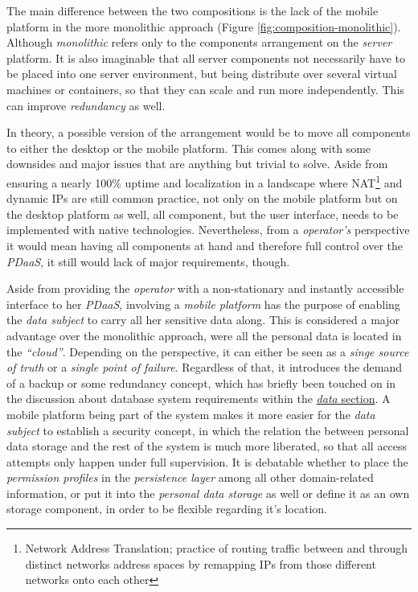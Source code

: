 \documentclass[12pt,english,a4paper,titlepage,cleardoublepage=empty,dottedtoc]{report}
\begin{document}
The main difference between the two compositions is the lack of the
mobile platform in the more monolithic approach (Figure
\ref{fig:composition-monolithic}). Although \emph{monolithic} refers
only to the components arrangement on the \emph{server} platform. It is
also imaginable that all server components not necessarily have to be
placed into one server environment, but being distribute over several
virtual machines or containers, so that they can scale and run more
independently. This can improve \emph{redundancy} as well.

In theory, a possible version of the arrangement would be to move all
components to either the desktop or the mobile platform. This comes
along with some downsides and major issues that are anything but trivial
to solve. Aside from ensuring a nearly 100\% uptime and localization in
a landscape where NAT\footnote{Network Address Translation; practice of
  routing traffic between and through distinct networks address spaces
  by remapping IPs from those different networks onto each other} and
dynamic IPs are still common practice, not only on the mobile platform
but on the desktop platform as well, all component, but the user
interface, needs to be implemented with native technologies.
Nevertheless, from a \emph{operator's} perspective it would mean having
all components at hand and therefore full control over the \emph{PDaaS},
it still would lack of major requirements, though.

Aside from providing the \emph{operator} with a non-stationary and
instantly accessible interface to her \emph{PDaaS}, involving a
\emph{mobile platform} has the purpose of enabling the \emph{data
subject} to carry all her sensitive data along. This is considered a
major advantage over the monolithic approach, were all the personal data
is located in the \emph{``cloud''}. Depending on the perspective, it can
either be seen as a \emph{singe source of truth} or a \emph{single point
of failure}. Regardless of that, it introduces the demand of a backup or
some redundancy concept, which has briefly been touched on in the
discussion about database system requirements within the
\protect\hyperlink{data}{\emph{data} section}. A mobile platform being
part of the system makes it more easier for the \emph{data subject} to
establish a security concept, in which the relation the between personal
data storage and the rest of the system is much more liberated, so that
all access attempts only happen under full supervision. It is debatable
whether to place the \emph{permission profiles} in the \emph{persistence
layer} among all other domain-related information, or put it into the
\emph{personal data storage} as well or define it as an own storage
component, in order to be flexible regarding it's location.
\end{document}
